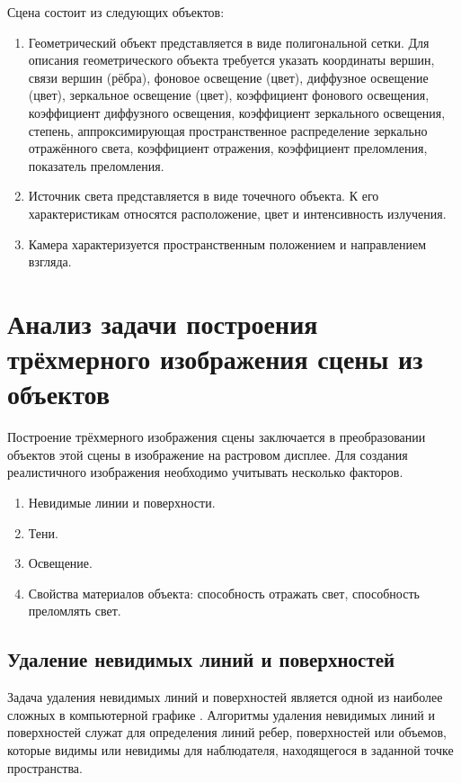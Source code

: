 Сцена состоит из следующих объектов:
\begin{enumerate}[label=\arabic*)]
	\item Геометрический объект представляется в виде полигональной сетки. Для описания геометрического объекта требуется указать координаты вершин, связи вершин (рёбра), фоновое освещение (цвет), диффузное освещение (цвет), зеркальное освещение (цвет), коэффициент фонового освещения, коэффициент диффузного освещения, коэффициент зеркального освещения, степень, аппроксимирующая пространственное распределение зеркально отражённого света, коэффициент отражения, коэффициент преломления, показатель преломления.
	\item Источник света представляется в виде точечного объекта. К его характеристикам относятся расположение, цвет и интенсивность излучения.
	\item Камера характеризуется пространственным положением и направлением взгляда.
\end{enumerate}

\section{Анализ задачи построения трёхмерного изображения сцены из объектов}

Построение трёхмерного изображения сцены заключается в преобразовании объектов этой сцены
в изображение на растровом дисплее. Для создания реалистичного изображения необходимо учитывать несколько факторов.
\begin{enumerate}[label=\arabic*)]
	\item Невидимые линии и поверхности.
	\item Тени.
	\item Освещение.
	\item Свойства материалов объекта: способность отражать свет, способность преломлять свет.
\end{enumerate}

\subsection{Удаление невидимых линий и поверхностей}\label{choiceraytracing}

Задача удаления невидимых линий и поверхностей является одной из наиболее сложных в компьютерной графике \cite{rodgers}.
Алгоритмы удаления невидимых линий и поверхностей служат для определения линий ребер, поверхностей или объемов, которые видимы или невидимы для наблюдателя, находящегося в заданной точке пространства.

